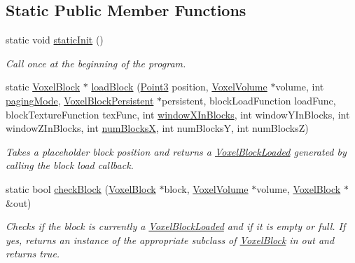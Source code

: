 \subsection*{\-Static \-Public \-Member \-Functions}
\begin{DoxyCompactItemize}
\item 
\hypertarget{classVoxelVolume_adc4edfa242d9aa7682c6809cf9563be6}{
static void \hyperlink{classVoxelVolume_adc4edfa242d9aa7682c6809cf9563be6}{static\-Init} ()}
\label{d0/d1c/classVoxelVolume_adc4edfa242d9aa7682c6809cf9563be6}

\begin{DoxyCompactList}\small\item\em \-Call once at the beginning of the program. \end{DoxyCompactList}\item 
\hypertarget{classVoxelVolume_a0a32c9371d8a8b87cb1e80b387deaa90}{
static \hyperlink{classVoxelBlock}{\-Voxel\-Block} $\ast$ \hyperlink{classVoxelVolume_a0a32c9371d8a8b87cb1e80b387deaa90}{load\-Block} (\hyperlink{classPoint3}{\-Point3} position, \hyperlink{classVoxelVolume}{\-Voxel\-Volume} $\ast$volume, int \hyperlink{classVoxelVolume_a084a098baa64b78ea2ce9fc609cda0e7}{paging\-Mode}, \hyperlink{classVoxelBlockPersistent}{\-Voxel\-Block\-Persistent} $\ast$persistent, block\-Load\-Function load\-Func, block\-Texture\-Function tex\-Func, int \hyperlink{classVoxelVolume_afa32a6c4d092024ca4a2cf7202637efd}{window\-X\-In\-Blocks}, int window\-Y\-In\-Blocks, int window\-Z\-In\-Blocks, int \hyperlink{classVoxelVolume_a98c9bdda61574015a5b2e008567f6910}{num\-Blocks\-X}, int num\-Blocks\-Y, int num\-Blocks\-Z)}
\label{d0/d1c/classVoxelVolume_a0a32c9371d8a8b87cb1e80b387deaa90}

\begin{DoxyCompactList}\small\item\em \-Takes a placeholder block position and returns a \hyperlink{classVoxelBlockLoaded}{\-Voxel\-Block\-Loaded} generated by calling the block load callback. \end{DoxyCompactList}\item 
\hypertarget{classVoxelVolume_a0a1e8cdc7c5c2ba73b08e3418579efce}{
static bool \hyperlink{classVoxelVolume_a0a1e8cdc7c5c2ba73b08e3418579efce}{check\-Block} (\hyperlink{classVoxelBlock}{\-Voxel\-Block} $\ast$block, \hyperlink{classVoxelVolume}{\-Voxel\-Volume} $\ast$volume, \hyperlink{classVoxelBlock}{\-Voxel\-Block} $\ast$\&out)}
\label{d0/d1c/classVoxelVolume_a0a1e8cdc7c5c2ba73b08e3418579efce}

\begin{DoxyCompactList}\small\item\em \-Checks if the block is currently a \hyperlink{classVoxelBlockLoaded}{\-Voxel\-Block\-Loaded} and if it is empty or full. \-If yes, returns an instance of the appropriate subclass of \hyperlink{classVoxelBlock}{\-Voxel\-Block} in out and returns true. \end{DoxyCompactList}\end{DoxyCompactItemize}
